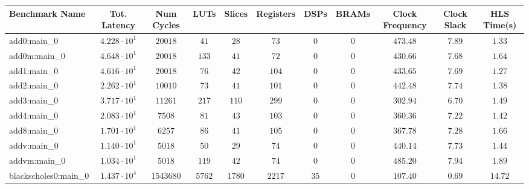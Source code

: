 \begin{tabular}{|l|c|c|c|c|c|c|c|c|c|c|}
\hline
Benchmark Name                 & Tot. Latency           & Num Cycles   & LUTs       & Slices     & Registers  & DSPs     & BRAMs    & Clock Frequency & Clock Slack & HLS Time(s) \\
\hline
add0:main\_0                   & $ 4.228 \cdot 10^{1} $ & $ 20018    $ & $ 41     $ & $ 28     $ & $ 73     $ & $ 0    $ & $ 0    $ & $ 473.48      $ & $ 7.89    $ & $ 1.33    $ \\
add0m:main\_0                  & $ 4.648 \cdot 10^{1} $ & $ 20018    $ & $ 133    $ & $ 41     $ & $ 72     $ & $ 0    $ & $ 0    $ & $ 430.66      $ & $ 7.68    $ & $ 1.64    $ \\
add1:main\_0                   & $ 4.616 \cdot 10^{1} $ & $ 20018    $ & $ 76     $ & $ 42     $ & $ 104    $ & $ 0    $ & $ 0    $ & $ 433.65      $ & $ 7.69    $ & $ 1.27    $ \\
add2:main\_0                   & $ 2.262 \cdot 10^{1} $ & $ 10010    $ & $ 73     $ & $ 41     $ & $ 101    $ & $ 0    $ & $ 0    $ & $ 442.48      $ & $ 7.74    $ & $ 1.38    $ \\
add3:main\_0                   & $ 3.717 \cdot 10^{1} $ & $ 11261    $ & $ 217    $ & $ 110    $ & $ 299    $ & $ 0    $ & $ 0    $ & $ 302.94      $ & $ 6.70    $ & $ 1.49    $ \\
add4:main\_0                   & $ 2.083 \cdot 10^{1} $ & $ 7508     $ & $ 81     $ & $ 43     $ & $ 103    $ & $ 0    $ & $ 0    $ & $ 360.36      $ & $ 7.22    $ & $ 1.42    $ \\
add8:main\_0                   & $ 1.701 \cdot 10^{1} $ & $ 6257     $ & $ 86     $ & $ 41     $ & $ 105    $ & $ 0    $ & $ 0    $ & $ 367.78      $ & $ 7.28    $ & $ 1.66    $ \\
addv:main\_0                   & $ 1.140 \cdot 10^{1} $ & $ 5018     $ & $ 50     $ & $ 29     $ & $ 74     $ & $ 0    $ & $ 0    $ & $ 440.14      $ & $ 7.73    $ & $ 1.44    $ \\
addvm:main\_0                  & $ 1.034 \cdot 10^{1} $ & $ 5018     $ & $ 119    $ & $ 42     $ & $ 74     $ & $ 0    $ & $ 0    $ & $ 485.20      $ & $ 7.94    $ & $ 1.89    $ \\
blackscholes0:main\_0          & $ 1.437 \cdot 10^{4} $ & $ 1543680  $ & $ 5762   $ & $ 1780   $ & $ 2217   $ & $ 35   $ & $ 0    $ & $ 107.40      $ & $ 0.69    $ & $ 14.72   $ \\

\end{tabular}
